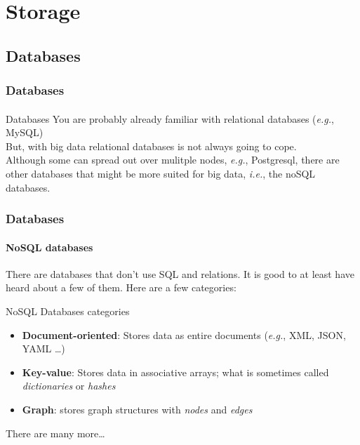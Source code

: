 \documentclass[aspectratio=169,usenames,dvipsnames]{beamer}
\begin{document}
\section{Storage}
    
    \subsection{Databases}
    \begin{frame}
        \frametitle{Databases}
        \framesubtitle{}

        \begin{block}{Databases}
        \small
            You are probably already familiar with \alert{relational databases} (\textit{e.g.}, MySQL) \\[10pt]

            But, with big data \alert{relational databases is not always going to cope}.\\[10pt]


            Although some can spread out over mulitple nodes, \textit{e.g.},
            Postgresql, there are other databases that might be more suited for
            big data, \textit{i.e.}, the \alert{noSQL databases}.
        \end{block}
    \end{frame}
    
    \begin{frame}
        \frametitle{Databases}
        \framesubtitle{NoSQL databases}

        There are databases that don't use SQL and relations. It is good to at
        least have heard about a few of them. Here are a few categories:

        \begin{block}{NoSQL Databases categories}
        \small
        \begin{itemize}
        \item \textbf{Document-oriented}: Stores data as entire documents (\textit{e.g.}, XML, JSON, YAML \ldots)
        \item \textbf{Key-value}: Stores data in associative arrays; what is sometimes
                         called \textit{dictionaries} or \textit{hashes}
        \item \textbf{Graph}: stores graph structures with \textit{nodes} and \textit{edges}
        \end{itemize}
        \end{block}
        There are many more\ldots
    \end{frame}
    
\end{document}
